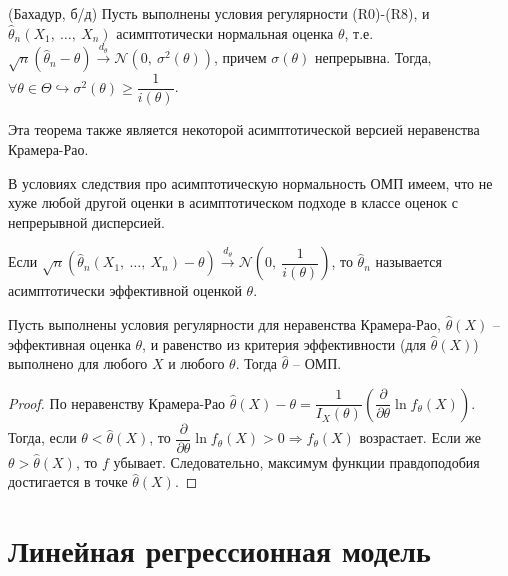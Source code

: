 \begin{theorem}
    (Бахадур, б/д) Пусть выполнены условия регулярности (R0)-(R8), и $\displaystyle \hat{\theta }_{n}( X_{1} ,\ \dotsc ,\ X_{n})$ асимптотически нормальная оценка $\displaystyle \theta $, т.е. $\displaystyle \sqrt{n}(\hat{\theta }_{n} -\theta )\xrightarrow{d_{\theta }}\mathcal{N}\left( 0,\ \sigma ^{2}( \theta )\right)$, причем $\displaystyle \sigma ( \theta )$ непрерывна. Тогда, $\displaystyle \forall \theta \in \Theta \hookrightarrow \sigma ^{2}( \theta ) \geqslant \dfrac{1}{i( \theta )}$.
\end{theorem}
\begin{note}
    Эта теорема также является некоторой асимптотической версией неравенства Крамера-Рао.
\end{note}
\begin{corollary}
    В условиях следствия про асимптотическую нормальность ОМП имеем, что не хуже любой другой оценки в асимптотическом подходе в классе оценок с непрерывной дисперсией.
\end{corollary}
\begin{definition}
    Если $\displaystyle \sqrt{n}(\hat{\theta }_{n}( X_{1} ,\ \dotsc ,\ X_{n}) -\theta )\xrightarrow{d_{\theta }}\mathcal{N}\left( 0,\ \dfrac{1}{i( \theta )}\right)$, то $\displaystyle \hat{\theta }_{n}$ называется асимптотически эффективной оценкой $\displaystyle \theta $.
\end{definition}
\begin{proposition}
    Пусть выполнены условия регулярности для неравенства Крамера-Рао, $\displaystyle \hat{\theta }( X)$ -- эффективная оценка $\displaystyle \theta $, и равенство из критерия эффективности (для $\displaystyle \hat{\theta }( X)$) выполнено для любого $\displaystyle X$ и любого $\displaystyle \theta $. Тогда $\displaystyle \hat{\theta }$ -- ОМП.
\end{proposition}
\begin{proof}
    По неравенству Крамера-Рао $\displaystyle \hat{\theta }( X) -\theta =\dfrac{1}{I_{X}( \theta )}\left(\dfrac{\partial }{\partial \theta }\ln f_{\theta }( X)\right)$. Тогда, если $\displaystyle \theta < \hat{\theta }( X)$, то $\displaystyle \dfrac{\partial }{\partial \theta }\ln f_{\theta }( X)  >0\Rightarrow f_{\theta }( X)$ возрастает. Если же $\displaystyle \theta  >\hat{\theta }( X)$, то $\displaystyle f$ убывает. Следовательно, максимум функции правдоподобия достигается в точке $\displaystyle \hat{\theta }( X)$.
\end{proof}
\section{Линейная регрессионная модель}

